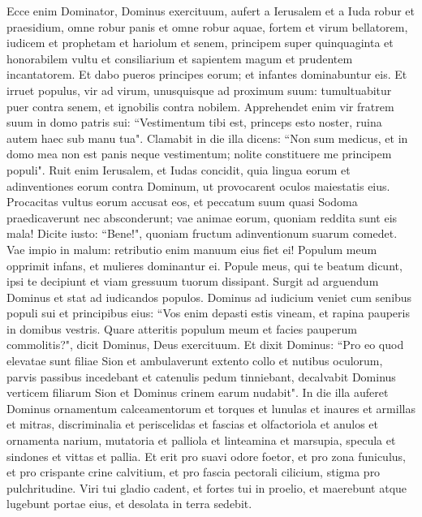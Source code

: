 \begin{biblechapter}  
\verse Ecce enim Dominator, Dominus exercituum, aufert a Ierusalem et a Iuda robur et praesidium, omne robur panis et omne robur aquae, 
\verse fortem et virum bellatorem, iudicem et prophetam et hariolum et senem, 
\verse principem super quinquaginta et honorabilem vultu et consiliarium et sapientem magum et prudentem incantatorem. 
\verse Et dabo pueros principes eorum; et infantes dominabuntur eis. 
\verse Et irruet populus, vir ad virum, unusquisque ad proximum suum: tumultuabitur puer contra senem, et ignobilis contra nobilem. 
\verse Apprehendet enim vir fratrem suum in domo patris sui: “Vestimentum tibi est, princeps esto noster, ruina autem haec sub manu tua". 
\verse Clamabit in die illa dicens: “Non sum medicus, et in domo mea non est panis neque vestimentum; nolite constituere me principem populi". 
\verse Ruit enim Ierusalem, et Iudas concidit, quia lingua eorum et adinventiones eorum contra Dominum, ut provocarent oculos maiestatis eius. 
\verse Procacitas vultus eorum accusat eos, et peccatum suum quasi Sodoma praedicaverunt nec absconderunt; vae animae eorum, quoniam reddita sunt eis mala! 
\verse Dicite iusto: “Bene!", quoniam fructum adinventionum suarum comedet. 
\verse Vae impio in malum: retributio enim manuum eius fiet ei! 
\verse Populum meum opprimit infans, et mulieres dominantur ei. Popule meus, qui te beatum dicunt, ipsi te decipiunt et viam gressuum tuorum dissipant. 
\verse Surgit ad arguendum Dominus et stat ad iudicandos populos. 
\verse Dominus ad iudicium veniet cum senibus populi sui et principibus eius: “Vos enim depasti estis vineam, et rapina pauperis in domibus vestris. 
\verse Quare atteritis populum meum et facies pauperum commolitis?", dicit Dominus, Deus exercituum. 
\verse Et dixit Dominus: “Pro eo quod elevatae sunt filiae Sion et ambulaverunt extento collo et nutibus oculorum, parvis passibus incedebant et catenulis pedum tinniebant, 
\verse decalvabit Dominus verticem filiarum Sion et Dominus crinem earum nudabit". 
\verse In die illa auferet Dominus ornamentum calceamentorum et torques 
\verse et lunulas et inaures et armillas et mitras, 
\verse discriminalia et periscelidas et fascias et olfactoriola 
\verse et anulos et ornamenta narium, 
\verse mutatoria et palliola et linteamina et marsupia, 
\verse specula et sindones et vittas et pallia. 
\verse Et erit pro suavi odore foetor, et pro zona funiculus, et pro crispante crine calvitium, et pro fascia pectorali cilicium, stigma pro pulchritudine. 
\verse Viri tui gladio cadent, et fortes tui in proelio, 
\verse et maerebunt atque lugebunt portae eius, et desolata in terra sedebit. 
\end{biblechapter}

